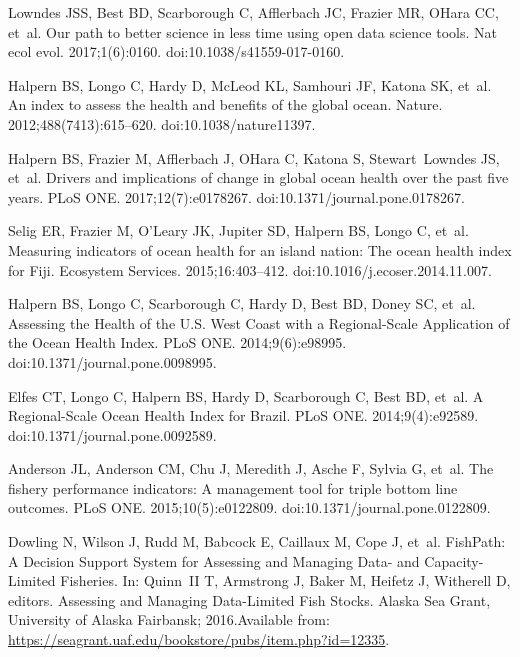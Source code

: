 \documentclass[10pt,letterpaper]{article}
\begin{document}
\begin{thebibliography}{10}
Lowndes JSS, Best BD, Scarborough C, Afflerbach JC, Frazier MR, OHara CC,
  et~al.
\newblock Our path to better science in less time using open data science
  tools.
\newblock Nat ecol evol. 2017;1(6):0160.
\newblock doi:{10.1038/s41559-017-0160}.

Halpern BS, Longo C, Hardy D, McLeod KL, Samhouri JF, Katona SK, et~al.
\newblock An index to assess the health and benefits of the global ocean.
\newblock Nature. 2012;488(7413):615--620.
\newblock doi:{10.1038/nature11397}.

Halpern BS, Frazier M, Afflerbach J, OHara C, Katona S, Stewart~Lowndes JS,
  et~al.
\newblock Drivers and implications of change in global ocean health over the
  past five years.
\newblock PLoS ONE. 2017;12(7):e0178267.
\newblock doi:{10.1371/journal.pone.0178267}.

Selig ER, Frazier M, O'Leary JK, Jupiter SD, Halpern BS, Longo C, et~al.
\newblock Measuring indicators of ocean health for an island nation: The ocean
  health index for Fiji.
\newblock Ecosystem Services. 2015;16:403--412.
\newblock doi:{10.1016/j.ecoser.2014.11.007}.

Halpern BS, Longo C, Scarborough C, Hardy D, Best BD, Doney SC, et~al.
\newblock Assessing the Health of the U.S. West Coast with a Regional-Scale
  Application of the Ocean Health Index.
\newblock PLoS ONE. 2014;9(6):e98995.
\newblock doi:{10.1371/journal.pone.0098995}.

Elfes CT, Longo C, Halpern BS, Hardy D, Scarborough C, Best BD, et~al.
\newblock A Regional-Scale Ocean Health Index for Brazil.
\newblock PLoS ONE. 2014;9(4):e92589.
\newblock doi:{10.1371/journal.pone.0092589}.

Anderson JL, Anderson CM, Chu J, Meredith J, Asche F, Sylvia G, et~al.
\newblock The fishery performance indicators: A management tool for triple
  bottom line outcomes.
\newblock PLoS ONE. 2015;10(5):e0122809.
\newblock doi:{10.1371/journal.pone.0122809}.

Dowling N, Wilson J, Rudd M, Babcock E, Caillaux M, Cope J, et~al.
\newblock FishPath: A Decision Support System for Assessing and Managing Data-
  and Capacity- Limited Fisheries.
\newblock In: Quinn~II T, Armstrong J, Baker M, Heifetz J, Witherell D,
  editors. Assessing and Managing Data-Limited Fish Stocks. Alaska Sea Grant,
  University of Alaska Fairbansk; 2016.Available from:
  \url{https://seagrant.uaf.edu/bookstore/pubs/item.php?id=12335}.


\end{thebibliography}
\end{document}
